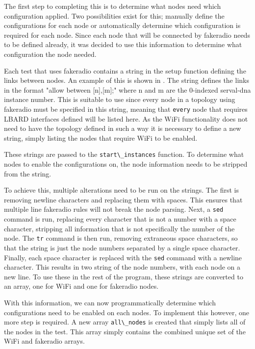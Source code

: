 
The first step to completing this is to determine what nodes need which configuration applied.
Two possibilities exist for this; manually define the configurations for each node or automatically determine which configuration is required for each node.
Since each node that will be connected by fakeradio needs to be defined already, it was decided to use this information to determine what configuration the node needed.

Each test that uses fakeradio contains a string in the setup function defining the links between nodes.
An example of this is shown in . 
The string defines the links in the format "allow between [n],[m];" where n and m are the 0-indexed serval-dna instance number.
This is suitable to use since every node in a topology using fakeradio must be specified in this string, meaning that \verb|every| node that requires LBARD interfaces defined will be listed here.
As the WiFi functionality does not need to have the topology defined in such a way it is necessary to define a new string, simply listing the nodes that require WiFi to be enabled. 

These strings are passed to the \verb|start\_instances| function. 
To determine what nodes to enable the configurations on, the node information needs to be stripped from the string.

To achieve this, multiple alterations need to be run on the strings.
The first is removing newline characters and replacing them with spaces.
This ensures that multiple line fakeradio rules will not break the node parsing.
Next, a \verb|sed| command is run, replacing every character that is not a number with a space character, stripping all information that is not specifically the number of the node.
The \verb|tr| command is then run, removing extraneous space characters, so that the string is just the node numbers separated by a single space character.
Finally, each space character is replaced with the \verb|sed| command with a newline character.
This results in two string of the node numbers, with each node on a new line.
To use these in the rest of the program, these strings are converted to an array, one for WiFi and one for fakeradio nodes.

With this information, we can now programmatically determine which configurations need to be enabled on each nodes.
To implement this however, one more step is required.
A new array \verb|all\_nodes| is created that simply lists all of the nodes in the test.
This array simply contains the combined unique set of the WiFi and fakeradio arrays.

